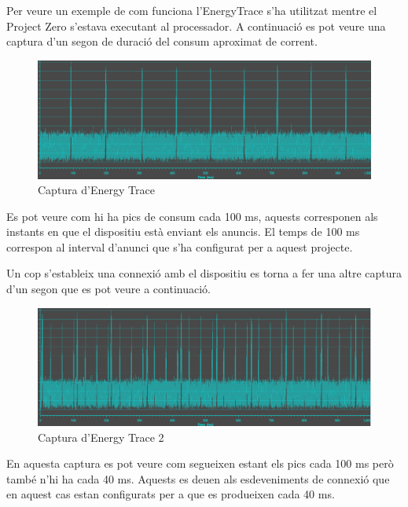 Per veure un exemple de com funciona l'EnergyTrace s'ha utilitzat mentre el Project Zero s'estava executant al processador. A continuació es pot veure una captura d'un segon de duració del consum aproximat de corrent.
\begin{figure}[!h]
	\begin{center}
		\includegraphics[width=\textwidth]{./images/energy_trace.png}
		\caption{Captura d'Energy Trace}
	\end{center}
\end{figure}

Es pot veure com hi ha pics de consum cada 100 ms, aquests corresponen als instants en que el dispositiu està enviant els anuncis.
El temps de 100 ms correspon al interval d'anunci que s'ha configurat per a aquest projecte.

Un cop s'estableix una connexió amb el dispositiu es torna a fer una altre captura d'un segon que es pot veure a continuació.

\begin{figure}[!h]
	\begin{center}
		\includegraphics[width=\textwidth]{./images/energy_trace_2.png}
		\caption{Captura d'Energy Trace 2}
	\end{center}
\end{figure}

En aquesta captura es pot veure com segueixen estant els pics cada 100 ms però també n'hi ha cada 40 ms.
Aquests es deuen als esdeveniments de connexió que en aquest cas estan configurats per a que es produeixen cada 40 ms.

